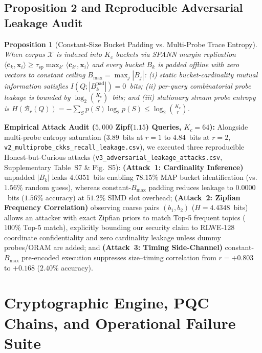\documentclass[10pt,journal,compsoc]{IEEEtran}
\newtheorem{proposition}{Proposition}
\begin{document}
\subsection{Proposition 2 and Reproducible Adversarial Leakage Audit}
\begin{proposition}[Constant-Size Bucket Padding vs. Multi-Probe Trace Entropy]\label{prop:leakage}
When corpus $\mathcal{X}$ is indexed into $K_c$ buckets via SPANN margin replication $\langle \mathbf{c}_k, \mathbf{x}_i\rangle \ge \tau_{\mathrm{sp}}\max_{k'}\langle \mathbf{c}_{k'},\mathbf{x}_i\rangle$ and every bucket $B_k$ is padded offline with zero vectors to constant ceiling $B_{\max} = \max_j |B_j|$: (i) static bucket-cardinality mutual information satisfies $I(Q; |B_k^{\mathrm{pad}}|) = 0$~bits; (ii) per-query combinatorial probe leakage is bounded by $\log_2\binom{K_c}{r}$~bits; and (iii) stationary stream probe entropy is $H(\mathcal{B}_r(Q)) = -\sum_S p(S)\log_2 p(S) \le \log_2\binom{K_c}{r}$.
\end{proposition}

\textbf{Empirical Attack Audit ($5,000$ Zipf($1.15$) Queries, $K_c=64$):} Alongside multi-probe entropy saturation ($3.89$~bits at $r=1$ to $4.84$~bits at $r=2$, \texttt{v2\_multiprobe\_ckks\_recall\_leakage.csv}), we executed three reproducible Honest-but-Curious attacks (\texttt{v3\_adversarial\_leakage\_attacks.csv}, Supplementary Table~S7 \& Fig.~S5): \textbf{(Attack~1: Cardinality Inference)} unpadded $|B_k|$ leaks $4.0351$~bits enabling $78.15\%$ MAP bucket identification (vs. $1.56\%$ random guess), whereas constant-$B_{\max}$ padding reduces leakage to $0.0000$~bits ($1.56\%$ accuracy) at $51.2\%$ SIMD slot overhead; \textbf{(Attack~2: Zipfian Frequency Correlation)} observing coarse pairs $(b_1,b_2)$ ($H=4.4348$~bits) allows an attacker with exact Zipfian priors to match Top-5 frequent topics ($100\%$ Top-5 match), explicitly bounding our security claim to RLWE-128 coordinate confidentiality and zero cardinality leakage unless dummy probes/ORAM are added; and \textbf{(Attack~3: Timing Side-Channel)} constant-$B_{\max}$ pre-encoded execution suppresses size--timing correlation from $r=+0.803$ to $+0.168$ ($2.40\%$ accuracy).

\section{Cryptographic Engine, PQC Chains, and Operational Failure Suite}\label{sec:system}
\end{document}
